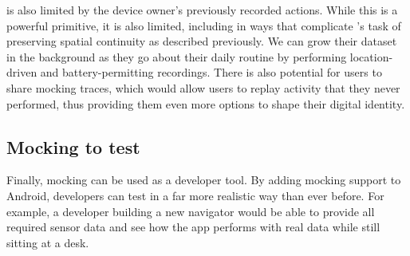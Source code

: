\PocketMocker{} is also limited by the device owner's previously recorded
actions. While this is a powerful primitive, it is also limited, including in
ways that complicate \PocketMocker{}'s task of preserving spatial continuity as
described previously. We can grow their dataset in the background as they go
about their daily routine by performing location-driven and battery-permitting
recordings. There is also potential for users to share mocking traces, which
would allow users to replay activity that they never performed, thus providing
them even more options to shape their digital identity.

\subsection{Mocking to test}

Finally, mocking can be used as a developer tool. By adding mocking support to
Android, developers can test in a far more realistic way than ever before. For
example, a developer building a new navigator would be able to provide all
required sensor data and see how the app performs with real data while still
sitting at a desk.
